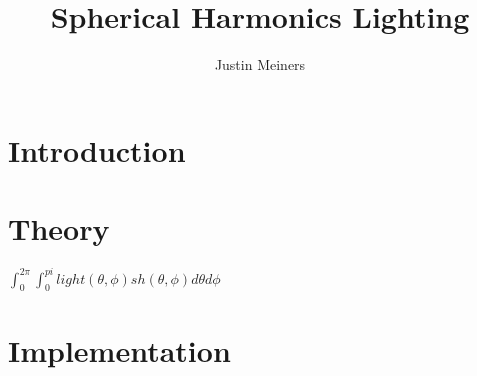 \documentclass[11pt,letterpaper]{article}
\begin{document}
\title{Spherical Harmonics Lighting}
\author{Justin Meiners}

\maketitle

\section{Introduction}

\section{Theory}



    $\int_{0}^{2\pi} \int_{0}^{pi} light(\theta, \phi) sh(\theta, \phi) d\theta d\phi$


\section{Implementation}
\end{document}
